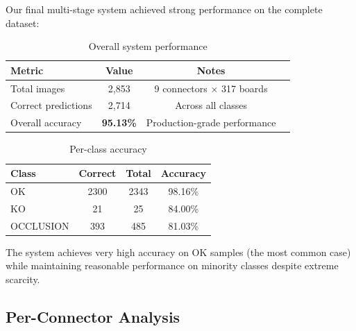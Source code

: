 \documentclass[11pt,a4paper,draft]{article}
\begin{document}
Our final multi-stage system achieved strong performance on the complete dataset:

\begin{table}[H]
\centering
\begin{tabular}{lccc}
\toprule
\textbf{Metric} & \textbf{Value} & \textbf{Notes} \\
\midrule
Total images & 2,853 & 9 connectors × 317 boards \\
Correct predictions & 2,714 & Across all classes \\
Overall accuracy & \textbf{95.13\%} & Production-grade performance \\
\bottomrule
\end{tabular}
\caption{Overall system performance}
\label{tab:overall}
\end{table}

\begin{table}[H]
\centering
\begin{tabular}{lccc}
\toprule
\textbf{Class} & \textbf{Correct} & \textbf{Total} & \textbf{Accuracy} \\
\midrule
OK & 2300 & 2343 & 98.16\% \\
KO & 21 & 25 & 84.00\% \\
OCCLUSION & 393 & 485 & 81.03\% \\
\bottomrule
\end{tabular}
\caption{Per-class accuracy}
\label{tab:class_acc}
\end{table}

The system achieves very high accuracy on OK samples (the most common case) while maintaining reasonable performance on minority classes despite extreme scarcity.

\subsection{Per-Connector Analysis}
\end{document}
